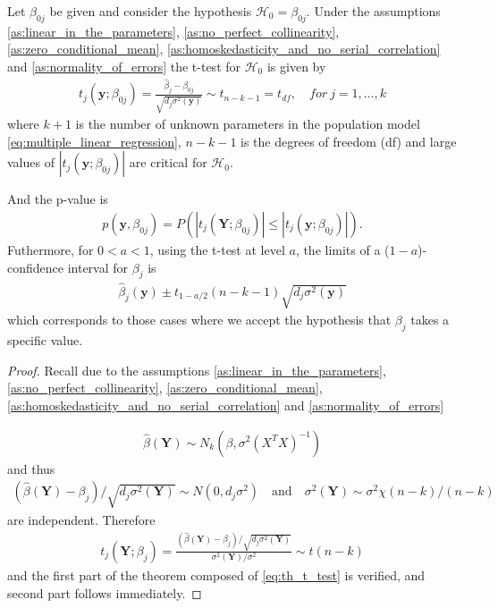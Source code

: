 \begin{theorem}  \label{th:t_distribution}
Let $\beta_{0j}$ be given and consider the hypothesis $\mathcal{H}_0=\beta_{0j}$. Under the assumptions \ref{as:linear_in_the_parameters}, \ref{as:no_perfect_collinearity}, \ref{as:zero_conditional_mean}, \ref{as:homoskedasticity_and_no_serial_correlation} and \ref{as:normality_of_errors} the t-test for $\mathcal{H}_0$ is given by
\begin{align}
   t_j(\textbf{y};\beta_{0j}) = \frac{\hat{\beta}_j - \beta_{0j}}{\sqrt{d_j\sigma^2(\textbf{y})}}\sim t_{n-k-1} = t_{df}, \quad for \ j=1,\ldots,k
\end{align}
where $k+1$ is the number of unknown parameters in the population model \eqref{eq:multiple_linear_regression}, $n-k-1$ is the degrees of freedom (df) and large values of $|t_j(\textbf{y};\beta_{0j})|$ are critical for $\mathcal{H}_0$.

And the p-value is
\begin{align}
    p(\textbf{y},\beta_{0j})=P(|t_j(\textbf{Y};\beta_{0j})|\leq |t_j(\textbf{y};\beta_{0j})|).
\end{align}
Futhermore, for $0<a<1$, using the t-test at level $a$, the limits of a ($1-a$)-confidence interval for $\beta_j$ is
\begin{align}
    \hat{\beta}_{j}(\textbf{y}) \pm t_{1-a/2}(n-k-1)\sqrt{d_j\sigma^2(\textbf{y})}
\end{align}
which corresponds to those cases where we accept the hypothesis that $\beta_j$ takes a specific value.
\end{theorem}
\begin{proof}
Recall due to the assumptions \ref{as:linear_in_the_parameters}, \ref{as:no_perfect_collinearity}, \ref{as:zero_conditional_mean}, \ref{as:homoskedasticity_and_no_serial_correlation} and \ref{as:normality_of_errors}

\begin{align} \label{eq:th_t_test}
    \hat{\beta}(\textbf{Y}) \sim N_k(\beta,\sigma^2(X^TX)^{-1})
\end{align}
and thus
\begin{align*}
    (\hat{\beta}(\textbf{Y})-\beta_j)/\sqrt{d_j\sigma^2(\textbf{Y})} \sim N(0,d_j \sigma^2) \quad \text{and} \quad \sigma^2(\textbf{Y}) \sim \sigma^2\chi (n-k)/(n-k)
\end{align*}
are independent. Therefore
\begin{align*}
    t_j(\textbf{Y};\beta_j)=\frac{(\hat{\beta}(\textbf{Y})-\beta_j)/\sqrt{d_j\sigma^2(\textbf{Y})}}{\sigma^2(\textbf{Y})/\sigma^2} \sim t(n-k)
\end{align*}
and the first part of the theorem composed of \eqref{eq:th_t_test} is verified, and second part follows immediately. 
\end{proof}

